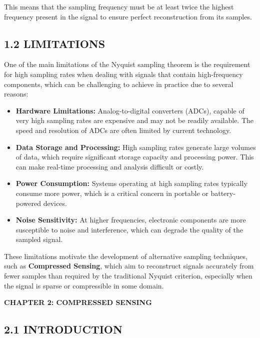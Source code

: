 \documentclass[
  letterpaper,
  DIV=11,
  numbers=noendperiod]{scrartcl}
\providecommand{\tightlist}{%
  \setlength{\itemsep}{0pt}\setlength{\parskip}{0pt}}
\providecommand{\mainsection}[1]{\begin{center}{\rmfamily\textbf{\fontsize{14}{20}\selectfont #1}}\end{center}}
\begin{document}
This means that the sampling frequency must be at least twice the
highest frequency present in the signal to ensure perfect reconstruction
from its samples.

\subsection{1.2 LIMITATIONS}\label{limitations}

One of the main limitations of the Nyquist sampling theorem is the
requirement for high sampling rates when dealing with signals that
contain high-frequency components, which can be challenging to achieve
in practice due to several reasons:

\begin{itemize}
\tightlist
\item
  \textbf{Hardware Limitations:} Analog-to-digital converters (ADCs),
  capable of very high sampling rates are expensive and may not be
  readily available. The speed and resolution of ADCs are often limited
  by current technology.
\item
  \textbf{Data Storage and Processing:} High sampling rates generate
  large volumes of data, which require significant storage capacity and
  processing power. This can make real-time processing and analysis
  difficult or costly.
\item
  \textbf{Power Consumption:} Systems operating at high sampling rates
  typically consume more power, which is a critical concern in portable
  or battery-powered devices.
\item
  \textbf{Noise Sensitivity:} At higher frequencies, electronic
  components are more susceptible to noise and interference, which can
  degrade the quality of the sampled signal.
\end{itemize}

These limitations motivate the development of alternative sampling
techniques, such as \textbf{Compressed Sensing}, which aim to
reconstruct signals accurately from fewer samples than required by the
traditional Nyquist criterion, especially when the signal is sparse or
compressible in some domain.

\newpage

\mainsection{CHAPTER 2: COMPRESSED SENSING}

\subsection{2.1 INTRODUCTION}\label{introduction-1}
\end{document}
